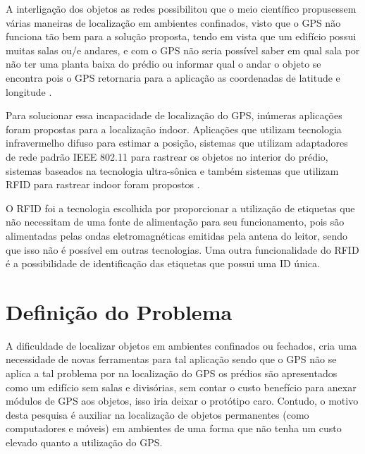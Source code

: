 A interligação dos objetos as redes possibilitou que o meio científico propusessem várias maneiras de localização em ambientes
confinados, visto que o GPS não funciona tão bem para a solução proposta, tendo em vista que um edifício possui
muitas salas ou/e andares, e com o GPS não seria possível saber em qual sala por não ter uma planta baixa do prédio ou
informar qual o andar o objeto se encontra pois o GPS retornaria para a aplicação as coordenadas de latitude e longitude \cite{rfid2009review}.


Para solucionar essa incapacidade de localização do GPS, inúmeras aplicações foram propostas para a localização indoor.
Aplicações que utilizam tecnologia infravermelho difuso para estimar a posição, sistemas que utilizam adaptadores de rede
padrão IEEE 802.11 para rastrear os objetos no interior do prédio, sistemas baseados na tecnologia ultra-sônica e
também sistemas que utilizam RFID para rastrear indoor foram propostos \cite{mechanismRFID2006}.


O RFID foi a tecnologia escolhida por proporcionar a utilização de etiquetas que não necessitam de uma fonte de alimentação
para seu funcionamento, pois são alimentadas pelas ondas eletromagnéticas emitidas pela antena do leitor, sendo que isso não
é possível em outras tecnologias. Uma outra funcionalidade do RFID é a possibilidade de identificação das etiquetas que possui
uma ID única.



\section{Definição do Problema}
A dificuldade de localizar objetos em ambientes confinados ou fechados, cria uma necessidade de novas ferramentas para
tal aplicação sendo que o GPS não se aplica a tal problema por na localização do GPS os prédios são apresentados como um edifício sem salas e divisórias, sem contar o custo benefício para anexar módulos de GPS aos objetos, isso iria deixar o protótipo caro. Contudo, o motivo desta pesquisa é auxiliar na localização de objetos permanentes (como computadores e móveis)
em ambientes de uma forma que não tenha um custo elevado quanto a utilização do
GPS\cite{mechanismRFID2006}.

